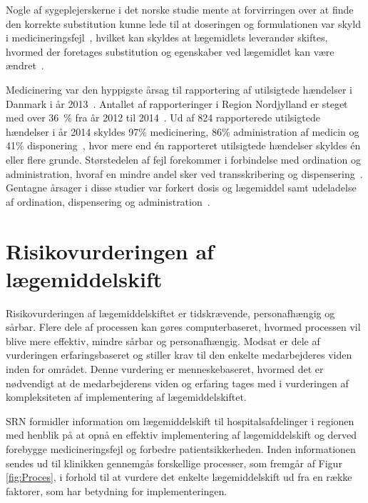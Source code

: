 Nogle af sygeplejerskerne i det norske studie mente at forvirringen over at finde den korrekte substitution kunne lede til at doseringen og formulationen var skyld i medicineringsfejl~\citep{Hakonsen2010}, hvilket kan skyldes at lægemidlets leverandør skiftes, hvormed der foretages substitution og egenskaber ved lægemidlet kan være ændret~\citep{Wittich2014}.

Medicinering var den hyppigste årsag til rapportering af utilsigtede hændelser i Danmark i år 2013~\citep{Patientombuddet2013}. Antallet af rapporteringer i Region Nordjylland er steget med over 36~\% fra år 2012 til 2014~\citep{Jensen2014}. Ud af 824 rapporterede utilsigtede hændelser i år 2014 skyldes 97\% medicinering, 86\% administration af medicin og 41\% disponering~\citep{Jensen2014}, hvor mere end én rapporteret utilsigtede hændelser skyldes én eller flere grunde. Størstedelen af fejl forekommer i forbindelse med ordination og administration, hvoraf en mindre andel sker ved transskribering og dispensering~\citep{Agrawal2009, Anderson2002}. Gentagne årsager i disse studier var forkert dosis og lægemiddel samt udeladelse af ordination, dispensering og administration~\citep{Barker2002,Sundhedsstyrelsen2005,Lisby2005, Tully2009}.

\section{Risikovurderingen af lægemiddelskift} \label{sec:ImpLaeg}
Risikovurderingen af lægemiddelskiftet er tidskrævende, personafhængig og sårbar. Flere dele af processen kan gøres computerbaseret, hvormed processen vil blive mere effektiv, mindre sårbar og personafhængig. Modsat er dele af vurderingen erfaringsbaseret og stiller krav til den enkelte medarbejderes viden inden for området. Denne vurdering er menneskebaseret, hvormed det er nødvendigt at de medarbejderens viden og erfaring tages med i vurderingen af kompleksiteten af implementering af lægemiddelskiftet. 

SRN formidler information om lægemiddelskift til hospitalsafdelinger i regionen med henblik på at opnå en effektiv implementering af lægemiddelskift og derved forebygge medicineringsfejl og forbedre patientsikkerheden. Inden informationen sendes ud til klinikken gennemgås forskellige processer, som fremgår af Figur \ref{fig:Proces}, i forhold til at vurdere det enkelte lægemiddelskift ud fra en række faktorer, som har betydning for implementeringen.

